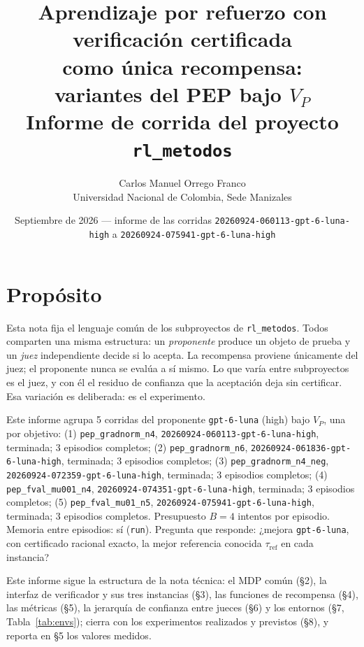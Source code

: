 \documentclass[11pt,a4paper]{article}
\title{Aprendizaje por refuerzo con verificación certificada\\como única recompensa:\\variantes del PEP bajo $V_P$\\[0.4em]\large Informe de corrida del proyecto \texttt{rl\_metodos}}
\author{Carlos Manuel Orrego Franco\\Universidad Nacional de Colombia, Sede Manizales}
\date{Septiembre de 2026 --- informe de las corridas \texttt{20260924-\allowbreak{}060113-\allowbreak{}gpt-\allowbreak{}6-\allowbreak{}luna-\allowbreak{}high} a \texttt{20260924-\allowbreak{}075941-\allowbreak{}gpt-\allowbreak{}6-\allowbreak{}luna-\allowbreak{}high}}
\begin{document}
\maketitle

\section{Propósito}

Esta nota fija el lenguaje común de los subproyectos de \texttt{rl\_metodos}. Todos comparten una misma estructura: un \emph{proponente} produce un objeto de prueba y un \emph{juez} independiente decide si lo acepta. La recompensa proviene únicamente del juez; el proponente nunca se evalúa a sí mismo. Lo que varía entre subproyectos es el juez, y con él el residuo de confianza que la aceptación deja sin certificar. Esa variación es deliberada: es el experimento.

{\sloppy Este informe agrupa 5 corridas del proponente \texttt{gpt-\allowbreak{}6-\allowbreak{}luna} (high) bajo $V_P$, una por objetivo: (1) \texttt{pep\_\allowbreak{}gradnorm\_\allowbreak{}n4}, \texttt{20260924-\allowbreak{}060113-\allowbreak{}gpt-\allowbreak{}6-\allowbreak{}luna-\allowbreak{}high}, terminada; 3 episodios completos; (2) \texttt{pep\_\allowbreak{}gradnorm\_\allowbreak{}n6}, \texttt{20260924-\allowbreak{}061836-\allowbreak{}gpt-\allowbreak{}6-\allowbreak{}luna-\allowbreak{}high}, terminada; 3 episodios completos; (3) \texttt{pep\_\allowbreak{}gradnorm\_\allowbreak{}n4\_\allowbreak{}neg}, \texttt{20260924-\allowbreak{}072359-\allowbreak{}gpt-\allowbreak{}6-\allowbreak{}luna-\allowbreak{}high}, terminada; 3 episodios completos; (4) \texttt{pep\_\allowbreak{}fval\_\allowbreak{}mu001\_\allowbreak{}n4}, \texttt{20260924-\allowbreak{}074351-\allowbreak{}gpt-\allowbreak{}6-\allowbreak{}luna-\allowbreak{}high}, terminada; 3 episodios completos; (5) \texttt{pep\_\allowbreak{}fval\_\allowbreak{}mu01\_\allowbreak{}n5}, \texttt{20260924-\allowbreak{}075941-\allowbreak{}gpt-\allowbreak{}6-\allowbreak{}luna-\allowbreak{}high}, terminada; 3 episodios completos. Presupuesto $B = 4$ intentos por episodio. Memoria entre episodios: sí (\texttt{run}). Pregunta que responde: ¿mejora \texttt{gpt-\allowbreak{}6-\allowbreak{}luna}, con certificado racional exacto, la mejor referencia conocida $\tau_{\mathrm{ref}}$ en cada instancia?\par}

Este informe sigue la estructura de la nota técnica: el MDP común (§2), la interfaz de verificador y sus tres instancias (§3), las funciones de recompensa (§4), las métricas (§5), la jerarquía de confianza entre jueces (§6) y los entornos (§7, Tabla~\ref{tab:envs}); cierra con los experimentos realizados y previstos (§8), y reporta en §5 los valores medidos.
\end{document}
